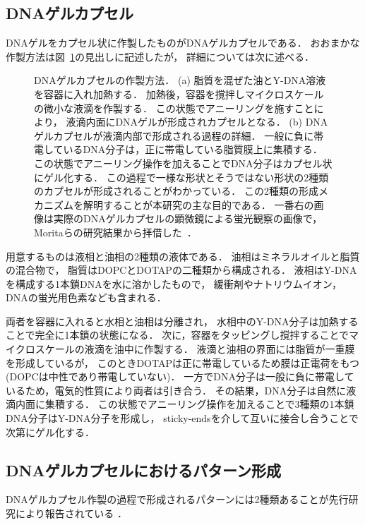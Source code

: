 \subsection{DNAゲルカプセル}
DNAゲルをカプセル状に作製したものがDNAゲルカプセルである．
おおまかな作製方法は図~\ref{fig:capsule}の見出しに記述したが，
詳細については次に述べる．
\begin{figure}
    \centering
    
    \caption{DNAゲルカプセルの作製方法．
        (a) 脂質を混ぜた油とY-DNA溶液を容器に入れ加熱する．
            加熱後，容器を撹拌しマイクロスケールの微小な液滴を作製する．
            この状態でアニーリングを施すことにより，
            液滴内面にDNAゲルが形成されカプセルとなる．
        (b) DNAゲルカプセルが液滴内部で形成される過程の詳細．
            一般に負に帯電しているDNA分子は，正に帯電している脂質膜上に集積する．
            この状態でアニーリング操作を加えることでDNA分子はカプセル状にゲル化する．
            この過程で一様な形状とそうではない形状の2種類のカプセルが形成されることがわかっている．
            この2種類の形成メカニズムを解明することが本研究の主な目的である．
            一番右の画像は実際のDNAゲルカプセルの顕微鏡による蛍光観察の画像で，
            Moritaらの研究結果から拝借した~\cite{moritasan}．
    }
    \label{fig:capsule}
\end{figure}

用意するものは液相と油相の2種類の液体である．
油相はミネラルオイルと脂質の混合物で，
脂質はDOPCとDOTAPの二種類から構成される．
液相はY-DNAを構成する1本鎖DNAを水に溶かしたもので，
緩衝剤やナトリウムイオン，DNAの蛍光用色素なども含まれる．

両者を容器に入れると水相と油相は分離され，
水相中のY-DNA分子は加熱することで完全に1本鎖の状態になる．
次に，容器をタッピングし撹拌することでマイクロスケールの液滴を油中に作製する．
液滴と油相の界面には脂質が一重膜を形成しているが，
このときDOTAPは正に帯電しているため膜は正電荷をもつ(DOPCは中性であり帯電していない)．
一方でDNA分子は一般に負に帯電しているため，電気的性質により両者は引き合う．
その結果，DNA分子は自然に液滴内面に集積する．
この状態でアニーリング操作を加えることで3種類の1本鎖DNA分子はY-DNA分子を形成し，
sticky-endsを介して互いに接合し合うことで次第にゲル化する．


\subsection{DNAゲルカプセルにおけるパターン形成}
DNAゲルカプセル作製の過程で形成されるパターンには2種類あることが先行研究により報告されている
\cite{morita2017formation}．

